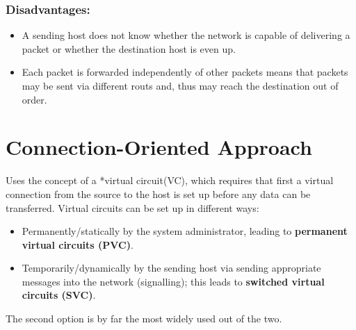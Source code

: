 \documentclass[11pt]{article}
\begin{document}
\subsubsection{Disadvantages:}
\label{sec:org6fa6423}
\begin{itemize}
\item A sending host does not know whether the network is capable of delivering a packet or whether the destination host is even up.
\item Each packet is forwarded independently of other packets means that packets may be sent via different routs and, thus may reach the destination out of order.
\end{itemize}

\section{Connection-Oriented Approach}
\label{sec:orgcf792ed}
Uses the concept of a *virtual circuit(VC), which requires that first a virtual connection from the source to the host is set up before any data can be transferred.
Virtual circuits can be set up in different ways:
\begin{itemize}
\item Permanently/statically by the system administrator, leading to \textbf{permanent virtual circuits (PVC)}.
\item Temporarily/dynamically by the sending host via sending appropriate messages into the network (signalling); this leads to \textbf{switched virtual circuits (SVC)}.
\end{itemize}
The second option is by far the most widely used out of the two.
\end{document}
